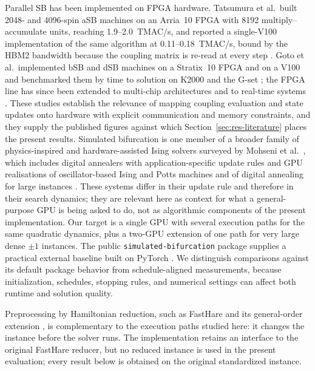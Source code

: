 \documentclass[11pt,a4paper]{article}
\newcommand{\code}[1]{\texttt{#1}}
\begin{document}
Parallel SB has been implemented on FPGA hardware. Tatsumura et al.\ built 2048- and 4096-spin aSB machines on an Arria~10 FPGA with 8192 multiply--accumulate units, reaching 1.9--2.0~TMAC/s, and reported a single-V100 implementation of the same algorithm at 0.11--0.18~TMAC/s, bound by the HBM2 bandwidth because the coupling matrix is re-read at every step \cite{fpga2019}. Goto et al.\ implemented bSB and dSB machines on a Stratix~10 FPGA and on a V100 and benchmarked them by time to solution on K2000 and the G-set \cite{goto2021}; the FPGA line has since been extended to multi-chip architectures \cite{tatsumura2021} and to real-time systems \cite{tatsumura2021heart}. These studies establish the relevance of mapping coupling evaluation and state updates onto hardware with explicit communication and memory constraints, and they supply the published figures against which Section~\ref{sec:res-literature} places the present results. Simulated bifurcation is one member of a broader family of physics-inspired and hardware-assisted Ising solvers surveyed by Mohseni et al.~\cite{mohseni2022}, which includes digital annealers with application-specific update rules \cite{aramon2019} and GPU realisations of oscillator-based Ising and Potts machines \cite{gonul2025} and of digital annealing for large instances \cite{vamsi2025}. These systems differ in their update rule and therefore in their search dynamics; they are relevant here as context for what a general-purpose GPU is being asked to do, not as algorithmic components of the present implementation. Our target is a single GPU with several execution paths for the same quadratic dynamics, plus a two-GPU extension of one path for very large dense $\pm1$ instances. The public \code{simulated-bifurcation} package supplies a practical external baseline \cite{publicsb} built on PyTorch \cite{pytorch}. We distinguish comparisons against its default package behavior from schedule-aligned measurements, because initialization, schedules, stopping rules, and numerical settings can affect both runtime and solution quality.

Preprocessing by Hamiltonian reduction, such as FastHare \cite{fasthare} and its general-order extension \cite{mao2026}, is complementary to the execution paths studied here: it changes the instance before the solver runs. The implementation retains an interface to the original FastHare reducer, but no reduced instance is used in the present evaluation; every result below is obtained on the original standardized instance.
\end{document}
